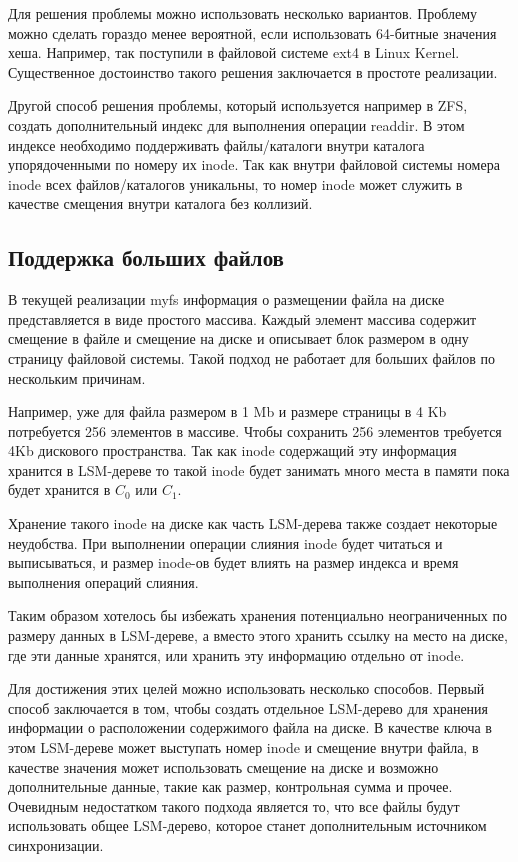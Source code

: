 Для решения проблемы можно использовать несколько вариантов. Проблему можно
сделать гораздо менее вероятной, если использовать 64-битные значения хеша.
Например, так поступили в файловой системе ext4 в Linux Kernel. Существенное
достоинство такого решения заключается в простоте реализации.

Другой способ решения проблемы, который используется например в ZFS, создать
дополнительный индекс для выполнения операции readdir. В этом индексе необходимо
поддерживать файлы/каталоги внутри каталога упорядоченными по номеру их inode.
Так как внутри файловой системы номера inode всех файлов/каталогов уникальны,
то номер inode может служить в качестве смещения внутри каталога без коллизий.


\subsection{Поддержка больших файлов}

В текущей реализации myfs информация о размещении файла на диске представляется
в виде простого массива. Каждый элемент массива содержит смещение в файле и
смещение на диске и описывает блок размером в одну страницу файловой системы.
Такой подход не работает для больших файлов по нескольким причинам.

Например, уже для файла размером в 1 Mb и размере страницы в 4 Kb потребуется
256 элементов в массиве. Чтобы сохранить 256 элементов требуется 4Kb дискового
пространства. Так как inode содержащий эту информация хранится в LSM-дереве то
такой inode будет занимать много места в памяти пока будет хранится в $C_0$ или
$C_1$.

Хранение такого inode на диске как часть LSM-дерева также создает некоторые
неудобства. При выполнении операции слияния inode будет читаться и выписываться,
и размер inode-ов будет влиять на размер индекса и время выполнения операций
слияния.

Таким образом хотелось бы избежать хранения потенциально неограниченных по
размеру данных в LSM-дереве, а вместо этого хранить ссылку на место на диске,
где эти данные хранятся, или хранить эту информацию отдельно от inode.

Для достижения этих целей можно использовать несколько способов. Первый способ
заключается в том, чтобы создать отдельное LSM-дерево для хранения информации
о расположении содержимого файла на диске. В качестве ключа в этом LSM-дереве
может выступать номер inode и смещение внутри файла, в качестве значения может
использовать смещение на диске и возможно дополнительные данные, такие как
размер, контрольная сумма и прочее. Очевидным недостатком такого подхода
является то, что все файлы будут использовать общее LSM-дерево, которое станет
дополнительным источником синхронизации.

